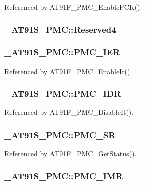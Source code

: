 Referenced by AT91F\_\-PMC\_\-EnablePCK().\hypertarget{struct__AT91S__PMC_bb9536acde7a8b8e1718206dda8c7032}{
\subsubsection{ {\bf \_\-AT91S\_\-PMC::Reserved4}}}
\label{struct__AT91S__PMC_bb9536acde7a8b8e1718206dda8c7032}


\hypertarget{struct__AT91S__PMC_5be217ac50dbfcfb9c812e1755db216b}{
\subsubsection{ {\bf \_\-AT91S\_\-PMC::PMC\_\-IER}}}
\label{struct__AT91S__PMC_5be217ac50dbfcfb9c812e1755db216b}




Referenced by AT91F\_\-PMC\_\-EnableIt().\hypertarget{struct__AT91S__PMC_e6dfa86a226b1526fe2ff35ebf29aae4}{
\subsubsection{ {\bf \_\-AT91S\_\-PMC::PMC\_\-IDR}}}
\label{struct__AT91S__PMC_e6dfa86a226b1526fe2ff35ebf29aae4}




Referenced by AT91F\_\-PMC\_\-DisableIt().\hypertarget{struct__AT91S__PMC_3818bbc0ea23c8beef3797db1be2d36e}{
\subsubsection{ {\bf \_\-AT91S\_\-PMC::PMC\_\-SR}}}
\label{struct__AT91S__PMC_3818bbc0ea23c8beef3797db1be2d36e}




Referenced by AT91F\_\-PMC\_\-GetStatus().\hypertarget{struct__AT91S__PMC_fb4ef7a28b15f03474fdf8e69a8968c0}{
\subsubsection{ {\bf \_\-AT91S\_\-PMC::PMC\_\-IMR}}}
\label{struct__AT91S__PMC_fb4ef7a28b15f03474fdf8e69a8968c0}




